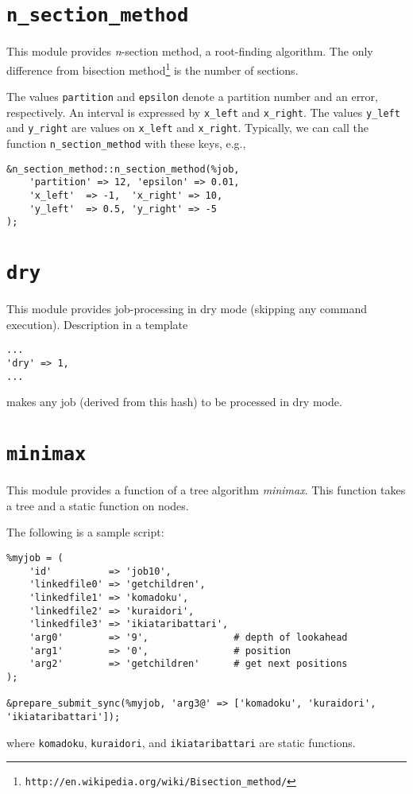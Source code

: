 \documentclass[a4paper,10pt]{report}
\begin{document}
\section{\texttt{n\_section\_method}}

This module provides \textit{n}-section method, a root-finding
algorithm. The only difference from bisection
method\footnote{\texttt{http://en.wikipedia.org/wiki/Bisection\_method/}}
is the number of sections.

The values \texttt{partition} and \texttt{epsilon} denote
    a partition number and an error, respectively.  An interval is
    expressed by \texttt{x\_left} and \texttt{x\_right}.  The values
    \texttt{y\_left} and \texttt{y\_right} are values on \texttt{x\_left}
    and \texttt{x\_right}.  Typically, we can call the function
    \texttt{n\_section\_method} with these keys, e.g.,
\begin{boxnote}
\begin{verbatim}
&n_section_method::n_section_method(%job,
    'partition' => 12, 'epsilon' => 0.01,
    'x_left'  => -1,  'x_right' => 10,
    'y_left'  => 0.5, 'y_right' => -5
);
\end{verbatim}
\end{boxnote}

\section{\texttt{dry}}

This module provides job-processing in dry mode (skipping any command
execution).  Description in a template
\begin{boxnote}
\begin{verbatim}
...
'dry' => 1,
...
\end{verbatim}
\end{boxnote}
\noindent
makes any job (derived from this hash) to be processed in dry mode.

\section{\texttt{minimax}}

This module provides a function of a tree algorithm \textit{minimax}.
This function takes a tree and a static function on nodes.

The following is a sample script:
\begin{boxnote}
\begin{verbatim}
%myjob = (
    'id'          => 'job10',
    'linkedfile0' => 'getchildren',
    'linkedfile1' => 'komadoku',
    'linkedfile2' => 'kuraidori',
    'linkedfile3' => 'ikiataribattari',
    'arg0'        => '9',               # depth of lookahead
    'arg1'        => '0',               # position
    'arg2'        => 'getchildren'      # get next positions
);

&prepare_submit_sync(%myjob, 'arg3@' => ['komadoku', 'kuraidori', 'ikiataribattari']);
\end{verbatim}
\end{boxnote}
\noindent
where \texttt{komadoku}, \texttt{kuraidori}, and
\texttt{ikiataribattari} are static functions.
\end{document}

